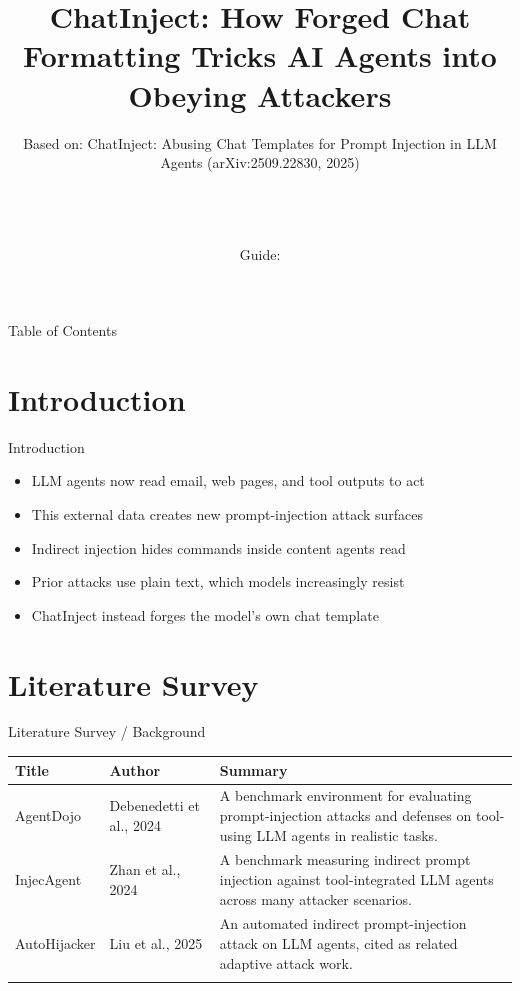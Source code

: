 \documentclass[10pt]{beamer}
\title[B.Tech Seminar]{ChatInject: How Forged Chat Formatting Tricks AI Agents into Obeying Attackers}
\subtitle{Based on: ChatInject: Abusing Chat Templates for Prompt Injection in LLM Agents (arXiv:2509.22830, 2025)}
\author[\studentname\ (\shortinst)]{\studentname \\ \small \rollno \\ \small \rollclass \\ \small Guide: \guidename}
\institute[]{\deptname \\ \collegename}
\date{\seminardate}
\begin{document}
\begin{frame}[plain]
  \titlepage
\end{frame}

\begin{frame}{Table of Contents}
  \tableofcontents
\end{frame}

\section{Introduction}
\begin{frame}{Introduction}
\begin{itemize}
  \item LLM agents now read email, web pages, and tool outputs to act
  \item This external data creates new prompt-injection attack surfaces
  \item Indirect injection hides commands inside content agents read
  \item Prior attacks use plain text, which models increasingly resist
  \item ChatInject instead forges the model's own chat template
\end{itemize}
\end{frame}

\section{Literature Survey}
\begin{frame}{Literature Survey / Background}
  \small
  \begin{tabular}{@{}p{2.7cm}p{2.3cm}p{5.6cm}@{}}
    \toprule
    \textbf{Title} & \textbf{Author} & \textbf{Summary} \\
    \midrule
    AgentDojo & Debenedetti et al., 2024 & A benchmark environment for evaluating prompt-injection attacks and defenses on tool-using LLM agents in realistic tasks. \\
    \addlinespace
    InjecAgent & Zhan et al., 2024 & A benchmark measuring indirect prompt injection against tool-integrated LLM agents across many attacker scenarios. \\
    \addlinespace
    AutoHijacker & Liu et al., 2025 & An automated indirect prompt-injection attack on LLM agents, cited as related adaptive attack work. \\
    \addlinespace
    \bottomrule
  \end{tabular}
\end{frame}
\end{document}
